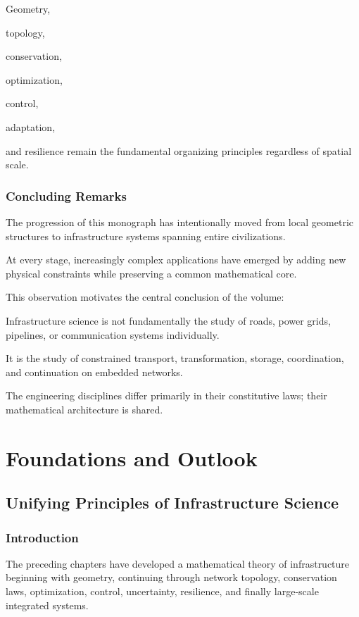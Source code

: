 \documentclass[11pt,fleqn]{book}
\numberwithin{equation}{chapter}
\theoremstyle{plain}
\theoremstyle{definition}
\theoremstyle{remark}
\begin{document}
Geometry,

topology,

conservation,

optimization,

control,

adaptation,

and resilience remain the fundamental organizing principles regardless
of spatial scale.


\section{Concluding Remarks}

The progression of this monograph has intentionally moved from local
geometric structures to infrastructure systems spanning entire
civilizations.

At every stage, increasingly complex applications have emerged by adding
new physical constraints while preserving a common mathematical core.

This observation motivates the central conclusion of the volume:

Infrastructure science is not fundamentally the study of roads, power
grids, pipelines, or communication systems individually.

It is the study of constrained transport, transformation, storage,
coordination, and continuation on embedded networks.

The engineering disciplines differ primarily in their constitutive laws;
their mathematical architecture is shared.

\part{Foundations and Outlook}

\chapter{Unifying Principles of Infrastructure Science}

\section{Introduction}

The preceding chapters have developed a mathematical theory of
infrastructure beginning with geometry, continuing through network
topology, conservation laws, optimization, control, uncertainty,
resilience, and finally large-scale integrated systems.
\end{document}
